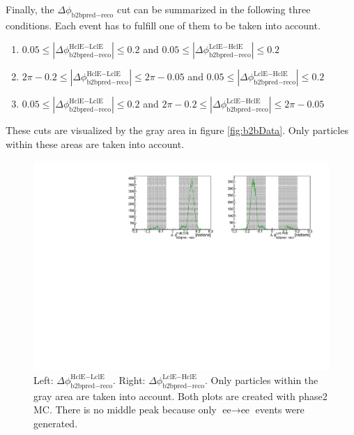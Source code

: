 \documentclass[a4paper,11pt,twosided,final,german,openbib,pdftex,listof=totoc,bibliography=totoc]{scrbook}
\begin{document}
Finally, the $\Delta \phi _{\textrm{b2bpred} - \textrm{reco}}$ cut can be summarized in the following three conditions. Each event has to fulfill one of them to be taken into account.

\begin{enumerate}[label=(\alph*)]
	\item $0.05 \leq |\Delta \phi _{\textrm{b2bpred} - \textrm{reco}}^{\textrm{HclE}-\textrm{LclE}}| \leq 0.2$ and $ 0.05 \leq |\Delta \phi _{\textrm{b2bpred} - \textrm{reco}}^{\textrm{LclE}-\textrm{HclE}}| \leq 0.2$
	\item $2\pi - 0.2 \leq |\Delta \phi _{\textrm{b2bpred} - \textrm{reco}}^{\textrm{HclE}-\textrm{LclE}}|\leq 2\pi - 0.05$ and $ 0.05 \leq |\Delta \phi _{\textrm{b2bpred} - \textrm{reco}}^{\textrm{LclE}-\textrm{HclE}}| \leq 0.2$
	\item $0.05 \leq|\Delta \phi _{\textrm{b2bpred} - \textrm{reco}}^{\textrm{HclE}-\textrm{LclE}}| \leq 0.2 $ and $2\pi - 0.2 \leq |\Delta \phi _{\textrm{b2bpred} - \textrm{reco}}^{\textrm{LclE}-\textrm{HclE}}| \leq 2\pi - 0.05$
\end{enumerate}

These cuts are visualized by the gray area in figure \ref{fig:b2bData}. Only particles within these areas are taken into account.




\begin{figure}[h!]
	\centering
	\includegraphics[width=\textwidth]{Plots/master/sb2b_MC.pdf}
	\caption[b2bClusterPhi - clusterPhi For Phase2 MC]{Left: $\Delta \phi _{\textrm{b2bpred} - \textrm{reco}}^{\textrm{HclE}-\textrm{LclE}}$. Right:  $\Delta \phi _{\textrm{b2bpred} - \textrm{reco}}^{\textrm{LclE}-\textrm{HclE}}$. Only particles within the gray area are taken into account. Both plots are created with phase2 MC. There is no middle peak because only $\textrm{ee} \rightarrow \textrm{ee}$ events were generated.}
	\label{fig:b2bMC}
\end{figure}
\end{document}
